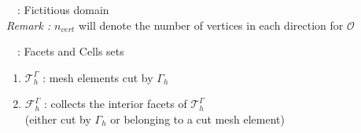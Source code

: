 \begin{frame}{\appendixname~\theappendixframenumber~: Fictitious domain}
	\footnotesize
	\; \\
	\textit{Remark :} $n_{vert}$ will denote the number of vertices in each direction for $\mathcal{O}$
\end{frame}

\begin{frame}{\appendixname~\theappendixframenumber~: Facets and Cells sets}
	
	\vspace{15pt}
	
	\begin{center}
		\begin{minipage}{0.48\linewidth}
			\centering
		\end{minipage} \hfill
		\begin{minipage}{0.48\linewidth}
			\centering
		\end{minipage}
	\end{center}
	
	\begin{enumerate}[\ding{217}]
		\item $\mathcal{T}_h^\Gamma$ : mesh elements cut by $\Gamma_h$
		\item $\mathcal{F}_h^\Gamma$ : collects the interior facets of $\mathcal{T}_h^\Gamma$ \\
		(either cut by $\Gamma_h$ or belonging to a cut mesh element)
	\end{enumerate}
	

\end{frame}
